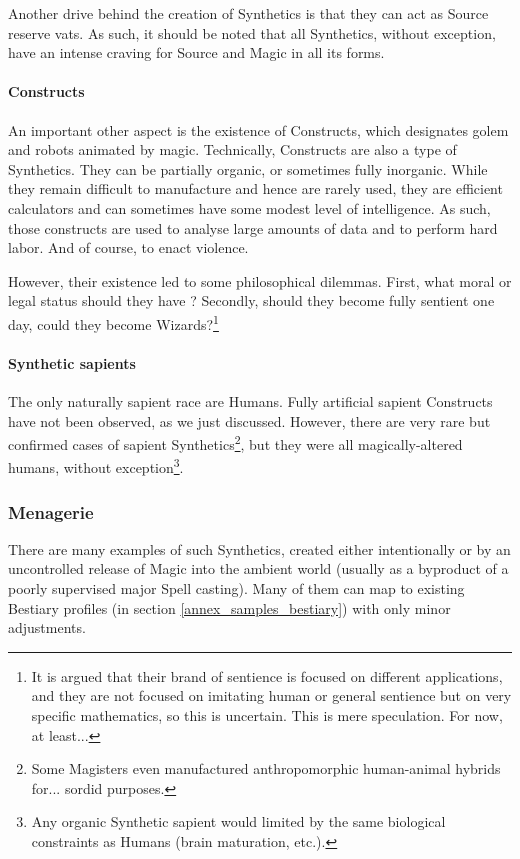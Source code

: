 Another drive behind the creation of Synthetics is that they can act as Source reserve vats. As such, it should be noted that all Synthetics, without exception, have an intense craving for Source and Magic in all its forms.


\paragraph{Constructs}

An important other aspect is the existence of Constructs, which designates golem and robots animated by magic. Technically, Constructs are also a type of Synthetics. They can be partially organic, or sometimes fully inorganic. While they remain difficult to manufacture and hence are rarely used, they are efficient calculators and can sometimes have some modest level of intelligence. As such, those constructs are used to analyse large amounts of data and to perform hard labor. And of course, to enact violence.

However, their existence led to some philosophical dilemmas. First, what moral or legal status should they have ? Secondly, should they become fully sentient one day, could they become Wizards?\footnote{It is argued that their brand of sentience is focused on different applications, and they are not focused on imitating human or general sentience but on very specific mathematics, so this is uncertain. This is mere speculation. For now, at least...} 


\paragraph{Synthetic sapients}

The only naturally sapient race are Humans. Fully artificial sapient Constructs have not been observed, as we just discussed. However, there are very rare but confirmed cases of sapient Synthetics\footnote{Some Magisters even manufactured anthropomorphic human-animal hybrids for... sordid purposes.}, but they were all magically-altered humans, without exception\footnote{Any organic Synthetic sapient would limited by the same biological constraints as Humans (brain maturation, etc.).}.


\subsubsection{Menagerie}


There are many examples of such Synthetics, created either intentionally or by an uncontrolled release of Magic into the ambient world (usually as a byproduct of a poorly supervised major Spell casting). Many of them can map to existing Bestiary profiles (in section \ref{annex_samples_bestiary}) with only minor adjustments.

